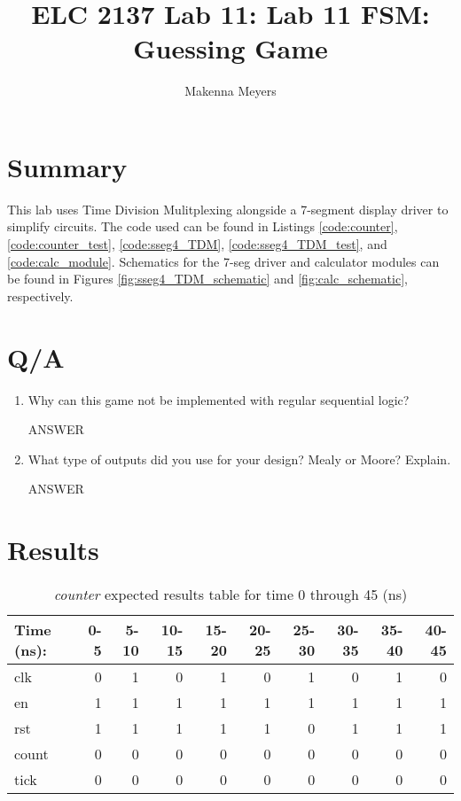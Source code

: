 \documentclass[11pt]{article}
\begin{document}
\title{ELC 2137 Lab 11: Lab 11 FSM: Guessing Game}
\author{Makenna Meyers}

\maketitle


\section*{Summary}
 This lab uses Time Division Mulitplexing alongside a 7-segment display driver to simplify circuits. The code used can be found in Listings \ref{code:counter}, \ref{code:counter_test}, \ref{code:sseg4_TDM}, \ref{code:sseg4_TDM_test}, and \ref{code:calc_module}. Schematics for the 7-seg driver and calculator modules can be found in Figures \ref{fig:sseg4_TDM_schematic} and \ref{fig:calc_schematic}, respectively. 
 
 \section*{Q/A}
 \begin{enumerate}
 	\item Why can this game not be implemented with regular sequential logic?
 	
 	ANSWER
 	
 	\item What type of outputs did you use for your design? Mealy or Moore? Explain.
 	
 	ANSWER
 	
 \end{enumerate}


\section*{Results}

\begin{table*}[ht]\centering
	\caption{\textit{counter} expected results table for time 0 through 45 (ns)}
	\label{ALU:tbl:counter_ERT_1}\medskip
	\begin{tabular}{l|rrrrrrrrr}
		Time (ns): & 0-5 & 5-10 & 10-15 & 15-20 & 20-25 & 25-30 & 30-35 & 35-40 & 40-45 \\
		\midrule
		clk & 0 & 1 & 0 & 1 & 0 & 1 & 0 & 1 & 0 \\
		en  & 1 & 1 & 1 & 1 & 1 & 1 & 1 & 1 & 1 \\
		rst & 1 & 1 & 1 & 1 & 1 & 0 & 1 & 1 & 1 \\
		count & 0 & 0 & 0 & 0 & 0 & 0 & 0 & 0 & 0 \\
		tick & 0 & 0 & 0 & 0 & 0 & 0 & 0 & 0 & 0 \\
		\bottomrule
	\end{tabular}
\end{table*}
\end{document}
